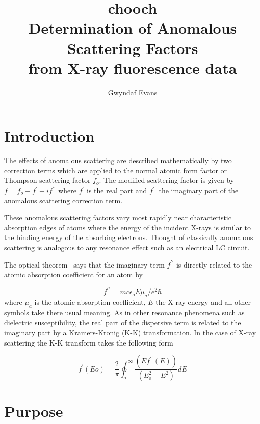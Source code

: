 \documentclass[a4paper]{article}
\begin{document}

\title{{\bf chooch} \\
Determination of Anomalous Scattering Factors \\
from X-ray fluorescence data}
\author{Gwyndaf Evans}
\maketitle

\section*{Introduction}

The effects of anomalous scattering are described mathematically by
two correction terms which are applied to the normal atomic form
factor or Thompson scattering factor $f_{o}$. The modified scattering
factor is given by $f = f_{o} + f^{\prime} + if^{\prime\prime}$ where
$f^{\prime}$ is the real part and $f^{\prime\prime}$ the imaginary
part of the anomalous scattering correction term.

These anomalous scattering factors vary most rapidly near
characteristic absorption edges of atoms where the energy of the
incident X-rays is similar to the binding energy of the absorbing
electrons. Thought of classically anomalous scattering is analogous
to any resonance effect such as an electrical LC circuit. 

The optical theorem~\cite{james69:_optic_princ_diffr_x} says that the imaginary term
$f^{\prime\prime}$ is directly related to the atomic absorption
coefficient for an atom by

\begin{equation}
f^{\prime\prime} = mc \epsilon_{o}E\mu_{a}/e^{2}\hbar
\end{equation}
where $\mu_{a}$ is the atomic absorption coefficient, $E$ the X-ray
energy and all other symbols take there usual meaning. As in other
resonance phenomena such as dielectric susceptibility, the real part
of the dispersive term is related to the imaginary part by a
Kramers-Kronig (K-K) transformation. In the case of X-ray scattering
the K-K transform takes the following form

\begin{equation}
f^{\prime}(Eo)= \frac{2}{\pi}\oint_{o}^{\infty}
                \frac{(E f^{\prime\prime}(E))}{(E_{o}^{2} - E^{2})}dE 
\label{KK}
\end{equation}

\section*{Purpose}
\end{document}
